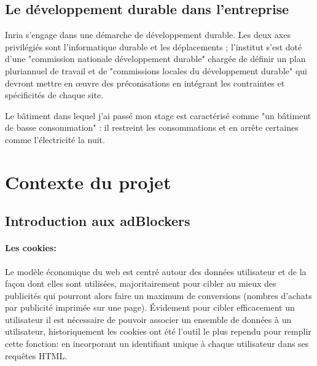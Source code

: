 \documentclass[oneside,a4paper,12pt]{article}
\begin{document}
\subsection{Le développement durable dans l'entreprise}
Inria s’engage dans une démarche de développement durable. Les deux axes privilégiés sont l'informatique durable et les déplacements ; l'institut s'est doté d'une "commission nationale développement durable" chargée de définir un plan pluriannuel de travail et de "commissions locales du développement durable" qui devront mettre en œuvre des préconisations en intégrant les contraintes et spécificités de chaque site.

Le bâtiment dans lequel j'ai passé mon stage est caractérisé comme "un bâtiment de basse consommation" : il restreint les consommations et en arrête certaines comme l'électricité la nuit.



\newpage

\section{Contexte du projet}
\subsection{Introduction aux adBlockers}\label{Intro:adblock}

\paragraph*{Les cookies:}

Le modèle économique du web est centré autour des données utilisateur et de la façon dont elles sont utilisées, majoritairement pour cibler au mieux des publicités qui pourront alors faire un maximum de conversions (nombres d'achats par publicité imprimée sur une page). Évidement pour cibler efficacement un utilisateur il est nécessaire de pouvoir associer un ensemble de données à un utilisateur, historiquement les cookies ont été l'outil le plus rependu pour remplir cette fonction: en incorporant un identifiant unique à chaque utilisateur dans ses requêtes HTML.\\
\end{document}
